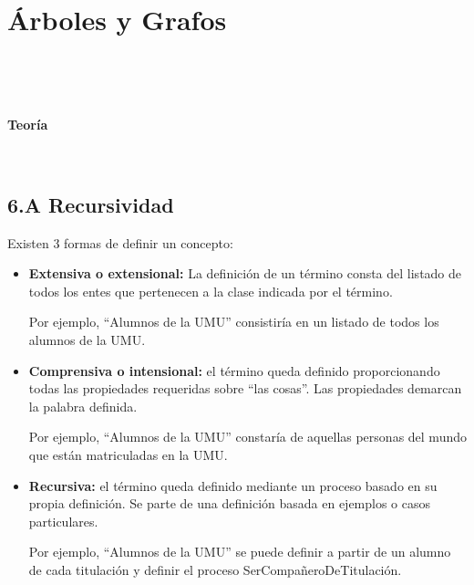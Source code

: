 


\chapter{Árboles y Grafos}

\localtableofcontents

\

\

\centerline{\Large \bf Teoría}

\formatoNormal

\



\section*{6.A Recursividad}
\label{sec:Recursividad}

Existen 3 formas de definir un concepto:


\begin{itemize}
\item {\bf Extensiva o extensional:}  La definición de un término consta del listado de todos los entes que pertenecen a la clase indicada por el término.

Por ejemplo, ``Alumnos de la UMU'' consistiría en un listado de todos los alumnos de la UMU.

\item {\bf Comprensiva o intensional:} el término queda definido proporcionando todas las propiedades requeridas sobre ``las cosas''. Las propiedades demarcan la palabra definida.

Por ejemplo, ``Alumnos de la UMU'' constaría de aquellas personas del mundo que están matriculadas en la UMU.

\item {\bf Recursiva:} el término queda definido mediante un proceso basado en su propia definición. Se parte de una definición basada en ejemplos o casos particulares.

Por ejemplo,  ``Alumnos de la UMU'' se puede definir a partir de un alumno de cada titulación y definir el proceso SerCompañeroDeTitulación.
\end{itemize}

